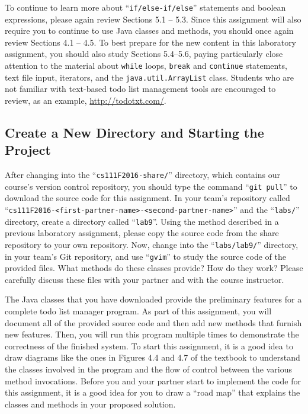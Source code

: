 To continue to learn more about ``{\tt if/else-if/else}'' statements and boolean expressions, please again review
Sections 5.1 -- 5.3. Since this assignment will also require you to continue to use Java classes and methods, you should
once again review Sections 4.1 -- 4.5.  To best prepare for the new content in this laboratory assignment, you should also
study Sections 5.4--5.6, paying particularly close attention to the material about {\tt while} loops, {\tt break} and
{\tt continue} statements, text file input, iterators, and the {\tt java.util.ArrayList} class. Students who are not
familiar with text-based todo list management tools are encouraged to review, as an example, \url{http://todotxt.com/}.

\vspace{-0.1in}
\subsection*{Create a New Directory and Starting the Project}
\vspace{-0.05in}

After changing into the ``{\tt cs111F2016-share/}'' directory, which contains our course's version control repository,
you should type the command ``{\tt git pull}'' to download the source code for this assignment.  In your team's
repository called ``{\tt cs111F2016-<first-partner-name>-<second-partner-name>}'' and the ``{\tt labs/}'' directory, create
a directory called ``{\tt lab9}''. Using the method described in a previous laboratory assignment, please copy the
source code from the share repository to your own repository. Now, change into the ``{\tt labs/lab9/}'' directory, in
your team's Git repository, and use ``{\tt gvim}'' to study the source code of the provided files. What methods do these
classes provide? How do they work? Please carefully discuss these files with your partner and with the course
instructor.

The Java classes that you have downloaded provide the preliminary features for a complete todo list manager program. As
part of this assignment, you will document all of the provided source code and then add new methods that furnish new
features.  Then, you will run this program multiple times to demonstrate the correctness of the finished system. To
start this assignment, it is a good idea to draw diagrams like the ones in Figures 4.4 and 4.7 of the textbook to
understand the classes involved in the program and the flow of control between the various method invocations. Before
you and your partner start to implement the code for this assignment, it is a good idea for you to draw a ``road map''
that explains the classes and methods in your proposed solution.

